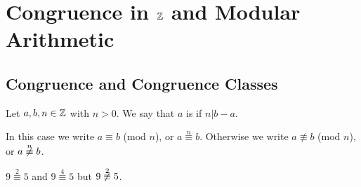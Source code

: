 \documentclass[11pt,fleqn,dvipsnames,usenames]{article}
\begin{document}
\section{Congruence in \texorpdfstring{$\mathbb{Z}$}{Z} and Modular Arithmetic}\label{congruencechapter}

\subsection{Congruence and Congruence Classes}

\begin{definition}\label{congruenceoperations}
Let $a,b,n\in\mathbb{Z}$ with $n > 0$.  We say that $a$ is  if $n|b-a$.
\end{definition}

\notation In this case we write $a\equiv b$ (mod $n$), or $a\overset{n}{\equiv}b$.  Otherwise we write $a\not\equiv b$ (mod $n$), or $a\not\overset{n}{\equiv}b$.

\example $9\overset{2}{\equiv}5$ and $9\overset{4}\equiv{5}$ but $9\not\overset{2}{\equiv}5$.
\end{document}
